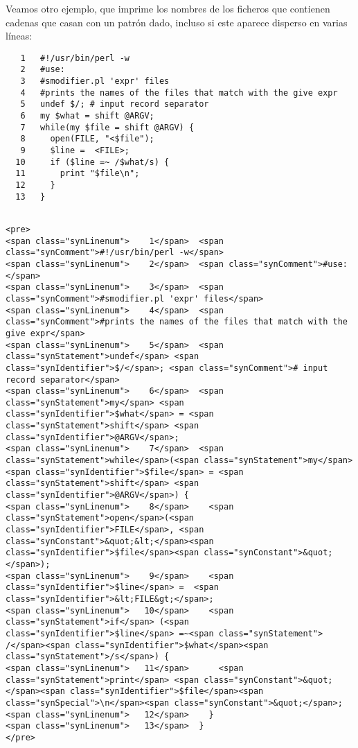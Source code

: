 Veamos otro ejemplo, que imprime los nombres de los ficheros que
contienen cadenas que casan con un patrón dado, incluso si este
aparece disperso en varias líneas:
\begin{latexonly}
\begin{verbatim}
   1   #!/usr/bin/perl -w
   2   #use: 
   3   #smodifier.pl 'expr' files
   4   #prints the names of the files that match with the give expr
   5   undef $/; # input record separator
   6   my $what = shift @ARGV;
   7   while(my $file = shift @ARGV) {
   8     open(FILE, "<$file");
   9     $line =  <FILE>;
  10     if ($line =~ /$what/s) {
  11       print "$file\n";
  12     }
  13   }
\end{verbatim}
\end{latexonly}
\begin{verbatim}

<pre>
<span class="synLinenum">    1</span>  <span class="synComment">#!/usr/bin/perl -w</span>
<span class="synLinenum">    2</span>  <span class="synComment">#use: </span>
<span class="synLinenum">    3</span>  <span class="synComment">#smodifier.pl 'expr' files</span>
<span class="synLinenum">    4</span>  <span class="synComment">#prints the names of the files that match with the give expr</span>
<span class="synLinenum">    5</span>  <span class="synStatement">undef</span> <span class="synIdentifier">$/</span>; <span class="synComment"># input record separator</span>
<span class="synLinenum">    6</span>  <span class="synStatement">my</span> <span class="synIdentifier">$what</span> = <span class="synStatement">shift</span> <span class="synIdentifier">@ARGV</span>;
<span class="synLinenum">    7</span>  <span class="synStatement">while</span>(<span class="synStatement">my</span> <span class="synIdentifier">$file</span> = <span class="synStatement">shift</span> <span class="synIdentifier">@ARGV</span>) {
<span class="synLinenum">    8</span>    <span class="synStatement">open</span>(<span class="synIdentifier">FILE</span>, <span class="synConstant">&quot;&lt;</span><span class="synIdentifier">$file</span><span class="synConstant">&quot;</span>);
<span class="synLinenum">    9</span>    <span class="synIdentifier">$line</span> =  <span class="synIdentifier">&lt;FILE&gt;</span>;
<span class="synLinenum">   10</span>    <span class="synStatement">if</span> (<span class="synIdentifier">$line</span> =~<span class="synStatement"> /</span><span class="synIdentifier">$what</span><span class="synStatement">/s</span>) {
<span class="synLinenum">   11</span>      <span class="synStatement">print</span> <span class="synConstant">&quot;</span><span class="synIdentifier">$file</span><span class="synSpecial">\n</span><span class="synConstant">&quot;</span>;
<span class="synLinenum">   12</span>    }
<span class="synLinenum">   13</span>  }
</pre>

\end{verbatim}

